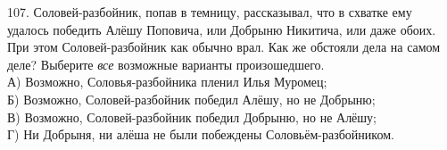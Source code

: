 107. Соловей-разбойник, попав в темницу, рассказывал, что в схватке ему удалось победить Алёшу Поповича, или Добрыню Никитича, или даже обоих. При этом Соловей-разбойник как обычно врал. Как же обстояли дела на самом деле? Выберите {\it все} возможные варианты произошедшего.\\
А) Возможно, Соловья-разбойника пленил Илья Муромец;\\
Б) Возможно, Соловей-разбойник победил Алёшу, но не Добрыню;\\
В) Возможно, Соловей-разбойник победил Добрыню, но не Алёшу;\\
Г) Ни Добрыня, ни алёша не были побеждены Соловьём-разбойником.\\
